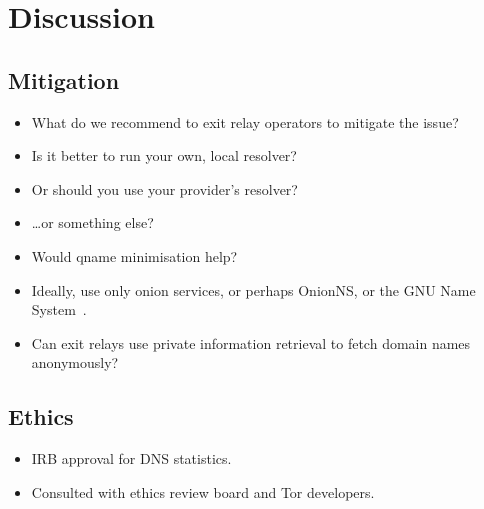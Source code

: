 \section{Discussion}
\label{sec:discussion}

\subsection{Mitigation}
\begin{itemize}
	\item What do we recommend to exit relay operators to mitigate the issue?
	\item Is it better to run your own, local resolver?
	\item Or should you use your provider's resolver?
	\item \ldots or something else?
	\item Would qname minimisation help?
	\item Ideally, use only onion services, or perhaps OnionNS, or the GNU Name
		System~\cite{Wachs2014a}.
	\item Can exit relays use private information retrieval to fetch domain
		names anonymously?
\end{itemize}

\subsection{Ethics}
\begin{itemize}
	\item IRB approval for DNS statistics.
	\item Consulted with ethics review board and Tor developers.
\end{itemize}
